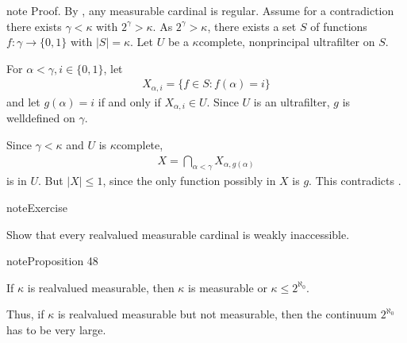 \documentclass[letterpaper,10pt,english]{jupyterBook}
\begin{document}
\begin{sphinxadmonition}{note}
\sphinxAtStartPar
Proof. By {\hyperref[\detokenize{large_cardinals:prop-measurable-regular}]{}}, any measurable cardinal is regular. Assume for a contradiction there exists \(\gamma < \kappa\) with \(2^\gamma > \kappa\). As \(2^\gamma > \kappa\), there exists a set \(S\) of functions \(f: \gamma \to \{0,1\}\) with \(|S| = \kappa\). Let \(U\) be a \(\kappa\)\sphinxhyphen{}complete, non\sphinxhyphen{}principal ultrafilter on \(S\).

\sphinxAtStartPar
For \(\alpha < \gamma, i \in \{0,1\}\), let
\begin{equation*}
\begin{split}
    X_{\alpha,i} = \{ f \in S \colon f(\alpha) = i\}
\end{split}
\end{equation*}
\sphinxAtStartPar
and let \(g(\alpha) = i\) if and only if \(X_{\alpha,i} \in U\). Since \(U\) is an ultrafilter, \(g\) is well\sphinxhyphen{}defined on \(\gamma\).

\sphinxAtStartPar
Since \(\gamma < \kappa\) and \(U\) is \(\kappa\)\sphinxhyphen{}complete,
\begin{equation*}
\begin{split}
    X = \bigcap_{\alpha < \gamma} X_{\alpha, g(\alpha)} 
\end{split}
\end{equation*}
\sphinxAtStartPar
is in \(U\). But \(|X| \leq 1\), since the only function possibly in \(X\) is \(g\). This contradicts {\hyperref[\detokenize{large_cardinals:lem-cardinality-kappa-ultrafilter}]{}}.
\end{sphinxadmonition}

\begin{sphinxadmonition}{note}{Exercise}

\sphinxAtStartPar
Show that every real\sphinxhyphen{}valued measurable cardinal is weakly inaccessible.
\end{sphinxadmonition}
\label{large_cardinals:prop-measurable-vs-real-valued}
\begin{sphinxadmonition}{note}{Proposition 48}



\sphinxAtStartPar
If \(\kappa\) is real\sphinxhyphen{}valued measurable, then \(\kappa\) is measurable or \(\kappa \le 2^{\aleph_0}\).
\end{sphinxadmonition}

\sphinxAtStartPar
Thus, if \(\kappa\) is real\sphinxhyphen{}valued measurable but not measurable, then the continuum \(2^{\aleph_0}\) has to be very large.
\end{document}
